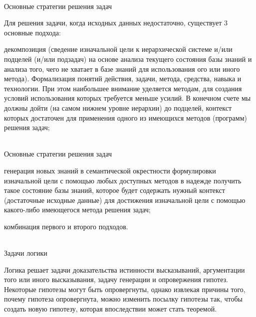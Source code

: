 \begin{frame}{\\Основные стратегии решения задач}
    \vspace{10mm}
    \begin{scn}
        Для решения задачи, когда исходных данных недостаточно, существует 3 основные подхода:
        \begin{textitemize}
            \item декомпозиция (сведение изначальной цели к иерархической системе и/или подцелей (и/или подзадач) на основе анализа текущего состояния базы знаний и анализа того, чего не хватает в базе знаний для использования ого или иного метода). Формализация понятий действия, задачи, метода, средства, навыка и технологии. При этом наибольшее внимание уделяется методам, для создания условий использования которых требуется меньше усилий. В конечном счете мы должны дойти (на самом нижнем уровне иерархии) до подцелей, контекст которых достаточен для применения одного из имеющихся методов (программ) решения задач;
        \end{textitemize}
    \end{scn}
\end{frame}

\begin{frame}{\\Основные стратегии решения задач}
    \begin{scn}
        \begin{textitemize}
            \item генерация новых знаний в семантической окрестности формулировки изначальной цели с помощью любых доступных методов в надежде получить такое состояние базы знаний, которое будет содержать нужный контекст (достаточные исходные данные) для достижения изначальной цели с помощью какого-либо имеющегося метода решения задач;
            \item комбинация первого и второго подходов.
        \end{textitemize}
    \end{scn}
\end{frame}

\begin{frame}{\\Задачи логики}
    \begin{scn}
        Логика решает задачи доказательства истинности высказываний, аргументации того или иного высказывания, задачу генерации и опровержения гипотез. Некоторые гипотезы могут быть опровергнуты, однако извлекая причины того, почему гипотеза опровергнута, можно изменить посылку гипотезы так, чтобы создать новую гипотезу, которая впоследствии может стать теоремой.
    \end{scn}
\end{frame}

